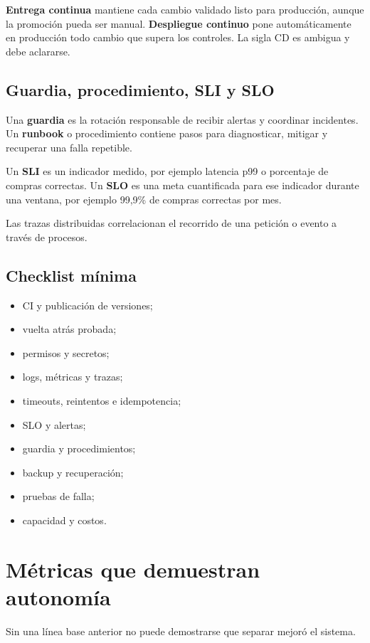 \documentclass[variant=apuntes,cover=institutional,mode=screen]{ua-engineering-v6-article}
\begin{document}
\textbf{Entrega continua} mantiene cada cambio validado listo para producción, aunque la promoción pueda ser manual. \textbf{Despliegue continuo} pone automáticamente en producción todo cambio que supera los controles. La sigla CD es ambigua y debe aclararse.

\subsection{Guardia, procedimiento, SLI y SLO}

Una \textbf{guardia} es la rotación responsable de recibir alertas y coordinar incidentes. Un \textbf{runbook} o procedimiento contiene pasos para diagnosticar, mitigar y recuperar una falla repetible.

Un \textbf{SLI} es un indicador medido, por ejemplo latencia p99 o porcentaje de compras correctas. Un \textbf{SLO} es una meta cuantificada para ese indicador durante una ventana, por ejemplo 99,9\% de compras correctas por mes.

Las trazas distribuidas correlacionan el recorrido de una petición o evento a través de procesos.

\subsection{Checklist mínima}

\begin{itemize}
\item CI y publicación de versiones;
\item vuelta atrás probada;
\item permisos y secretos;
\item logs, métricas y trazas;
\item timeouts, reintentos e idempotencia;
\item SLO y alertas;
\item guardia y procedimientos;
\item backup y recuperación;
\item pruebas de falla;
\item capacidad y costos.
\end{itemize}

\section{Métricas que demuestran autonomía}

Sin una línea base anterior no puede demostrarse que separar mejoró el sistema.
\end{document}
